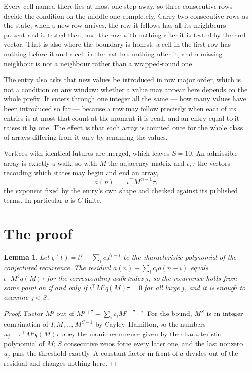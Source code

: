 \documentclass[11pt,a4paper]{article}
\theoremstyle{plain}
\newtheorem{lemma}[theorem]{Lemma}
\theoremstyle{definition}
\begin{document}
Every cell named there lies at most one step away, so three consecutive rows decide the condition on the middle one completely. Carry two consecutive rows as the state; when a new row arrives, the row it follows has all its neighbours present and is tested then, and the row with nothing after it is tested by the end vector. That is also where the boundary is honest: a cell in the first row has nothing before it and a cell in the last has nothing after it, and a missing neighbour is not a neighbour rather than a wrapped-round one.

The entry also asks that new values be introduced in row major order, which is not a condition on any window: whether a value may appear here depends on the whole prefix. It enters through one integer all the same --- how many values have been introduced so far --- because a row may follow precisely when each of its entries is at most that count at the moment it is read, and an entry equal to it raises it by one. The effect is that each array is counted once for the whole class of arrays differing from it only by renaming the values.

Vertices with identical futures are merged, which leaves $S=10$. An admissible array is exactly a walk, so with $M$ the adjacency matrix and $\iota,\tau$ the vectors recording which states may begin and end an array,
\[
a(n)\;=\;\iota^{\!\top}M^{\,n-1}\tau ,
\]
the exponent fixed by the entry's own shape and checked against its published terms. In
particular $a$ is $C$-finite.

\section{The proof}

\begin{lemma}\label{lem:crit}
Let $q(t)=t^{7}-\sum_i c_it^{7-i}$ be the characteristic polynomial of the
conjectured recurrence. The residual $a(n)-\sum_ic_ia(n-i)$ equals
$\iota^{\!\top}M^{\,j}q(M)\tau$ for the corresponding walk index $j$, so the recurrence
holds from some point on if and only if $\iota^{\!\top}M^{j}q(M)\tau=0$ for all large $j$,
and it is enough to examine $j<S$.
\end{lemma}

\begin{proof}
Factor $M^{j}$ out of $M^{j+7}-\sum_ic_iM^{j+7-i}$. For the bound, $M^{S}$
is an integer combination of $I,M,\dots,M^{S-1}$ by Cayley--Hamilton, so the numbers
$u_j=\iota^{\!\top}M^{j}q(M)\tau$ obey the monic recurrence given by the characteristic
polynomial of $M$; $S$ consecutive zeros force every later one, and the last nonzero $u_j$
pins the threshold exactly. A constant factor in front of $a$ divides out of the residual and
changes nothing here.
\end{proof}
\end{document}
